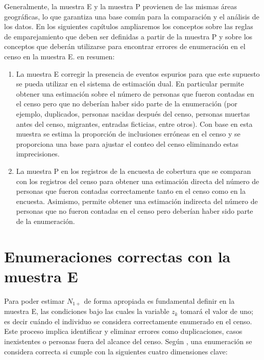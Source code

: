 \documentclass[
  12pt,
]{book}
\begin{document}
Generalmente, la muestra E y la muestra P provienen de las mismas áreas geográficas, lo que garantiza una base común para la comparación y el análisis de los datos. En los siguientes capítulos ampliaremos los conceptos sobre las reglas de emparejamiento que deben ser definidas a partir de la muestra P y sobre los conceptos que deberán utilizarse para encontrar errores de enumeración en el censo en la muestra E. en resumen:

\begin{enumerate}
\def\labelenumi{\arabic{enumi}.}
\item
  La muestra E corregir la presencia de eventos espurios para que este supuesto se pueda utilizar en el sistema de estimación dual. En particular permite obtener una estimación sobre el número de personas que fueron contadas en el censo pero que no deberían haber sido parte de la enumeración (por ejemplo, duplicados, personas nacidas después del censo, personas muertas antes del censo, migrantes, entradas ficticias, entre otros). Con base en esta muestra se estima la proporción de inclusiones erróneas en el censo y se proporciona una base para ajustar el conteo del censo eliminando estas imprecisiones.
\item
  La muestra P en los registros de la encuesta de cobertura que se comparan con los registros del censo para obtener una estimación directa del número de personas que fueron contadas correctamente tanto en el censo como en la encuesta. Asimismo, permite obtener una estimación indirecta del número de personas que no fueron contadas en el censo pero deberían haber sido parte de la enumeración.
\end{enumerate}

\section{Enumeraciones correctas con la muestra E}\label{enumeraciones-correctas-con-la-muestra-e}

Para poder estimar \(N_{1+}\) de forma apropiada es fundamental definir en la muestra E, las condiciones bajo las cuales la variable \(z_{k}\) tomará el valor de uno; es decir cuándo el individuo se considera correctamente enumerado en el censo. Este proceso implica identificar y eliminar errores como duplicaciones, casos inexistentes o personas fuera del alcance del censo. Según \citet{hogan2003}, una enumeración se considera correcta si cumple con la siguientes cuatro dimensiones clave:
\end{document}
